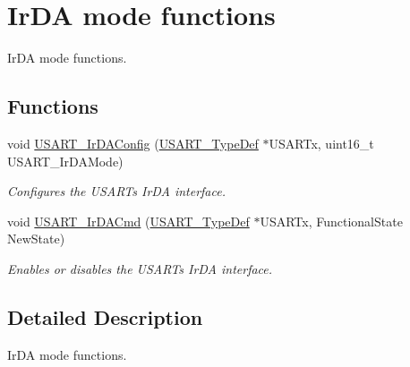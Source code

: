 \hypertarget{group___u_s_a_r_t___group7}{}\section{Ir\+DA mode functions}
\label{group___u_s_a_r_t___group7}


Ir\+DA mode functions.  


\subsection*{Functions}
\begin{DoxyCompactItemize}
\item 
void \hyperlink{group___u_s_a_r_t___group7_ga81a0cd36199040bf6d266b57babd678e}{U\+S\+A\+R\+T\+\_\+\+Ir\+D\+A\+Config} (\hyperlink{struct_u_s_a_r_t___type_def}{U\+S\+A\+R\+T\+\_\+\+Type\+Def} $\ast$U\+S\+A\+R\+Tx, uint16\+\_\+t U\+S\+A\+R\+T\+\_\+\+Ir\+D\+A\+Mode)
\begin{DoxyCompactList}\small\item\em Configures the U\+S\+A\+RT\textquotesingle{}s Ir\+DA interface. \end{DoxyCompactList}\item 
void \hyperlink{group___u_s_a_r_t___group7_gabff56ebb494fdfadcc6ef4fe9ac8dd24}{U\+S\+A\+R\+T\+\_\+\+Ir\+D\+A\+Cmd} (\hyperlink{struct_u_s_a_r_t___type_def}{U\+S\+A\+R\+T\+\_\+\+Type\+Def} $\ast$U\+S\+A\+R\+Tx, Functional\+State New\+State)
\begin{DoxyCompactList}\small\item\em Enables or disables the U\+S\+A\+RT\textquotesingle{}s Ir\+DA interface. \end{DoxyCompactList}\end{DoxyCompactItemize}


\subsection{Detailed Description}
Ir\+DA mode functions. 

